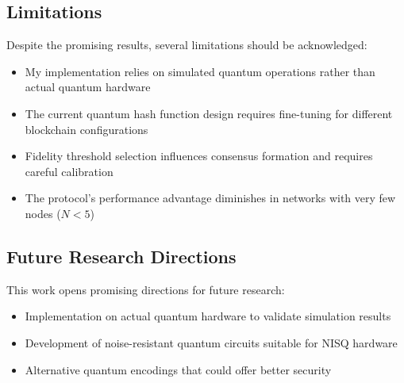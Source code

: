 \documentclass[11pt,a4paper]{article}
\begin{document}
\subsection{Limitations}
Despite the promising results, several limitations should be acknowledged:

\begin{itemize}
    \item My implementation relies on simulated quantum operations rather than actual quantum hardware
    \item The current quantum hash function design requires fine-tuning for different blockchain configurations
    \item Fidelity threshold selection influences consensus formation and requires careful calibration
    \item The protocol's performance advantage diminishes in networks with very few nodes ($N < 5$)
\end{itemize}

\subsection{Future Research Directions}
This work opens promising directions for future research:

\begin{itemize}
    \item Implementation on actual quantum hardware to validate simulation results
    \item Development of noise-resistant quantum circuits suitable for NISQ hardware
    \item Alternative quantum encodings that could offer better security
\end{itemize}
\end{document}
